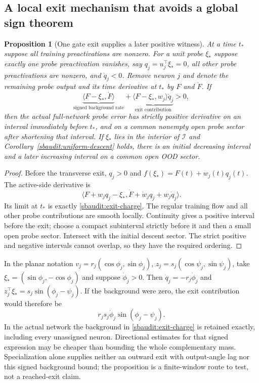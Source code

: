 \documentclass{article} %
\theoremstyle{plain}
\newtheorem{proposition}[theorem]{Proposition}
\theoremstyle{definition}
\theoremstyle{remark}
\begin{document}
\subsection{A local exit mechanism that avoids a global sign theorem}

\begin{proposition}[One gate exit supplies a later positive witness]
\label{sbaudit:exit-witness}
At a time $t_*$ suppose all training preactivations are nonzero. For a
unit probe $\xi_*$ suppose exactly one probe preactivation vanishes,
say $q_j=u_j^\top\xi_*=0$, all other probe preactivations are nonzero,
and $\dot q_j<0$. Remove neuron $j$ and denote the remaining probe
output and its time derivative at $t_*$ by $F$ and $\dot F$.
If
\begin{equation}\label{sbaudit:exit-charge}
 \underbrace{\langle F-\xi_*,\dot F\rangle}_{\text{signed background rate}}
 +\underbrace{\langle F-\xi_*,w_j\rangle\dot q_j}_{\text{exit contribution}}
 >0,
\end{equation}
then the actual full-network probe error has strictly positive derivative
on an interval immediately before $t_*$, and on a common nonempty open
probe sector after shortening that interval.
If $\xi_*$ lies in the interior of $\mathcal I$ and
Corollary~\ref{sbaudit:uniform-descent} holds, there is an initial decreasing
interval and a later increasing interval on a common open OOD sector.
\end{proposition}
\begin{proof}
Before the transverse exit, $q_j>0$ and
$f(\xi_*)=F(t)+w_j(t)q_j(t)$. The active-side derivative is
\[
 \langle F+w_jq_j-\xi_*,
       \dot F+\dot w_jq_j+w_j\dot q_j\rangle.
\]
Its limit at $t_*$ is exactly \eqref{sbaudit:exit-charge}. The regular
training flow and all other probe contributions are smooth locally.
Continuity gives a positive interval before the exit; choose a compact
subinterval strictly before it and then a small open probe sector.
Intersect with the initial descent sector. The strict positive and
negative intervals cannot overlap, so they have the required ordering.
\end{proof}

In the planar notation $v_j=r_j(\cos\phi_j,\sin\phi_j)$,
$z_j=s_j(\cos\psi_j,\sin\psi_j)$, take
$\xi_*=(\sin\phi_j,-\cos\phi_j)$ and suppose $\dot\phi_j>0$.
Then $\dot q_j=-r_j\dot\phi_j$ and
$z_j^\top\xi_*=s_j\sin(\phi_j-\psi_j)$.
If the background were zero, the exit contribution would therefore be
\begin{equation}\label{sbaudit:angular-exit}
 r_js_j\dot\phi_j\sin(\phi_j-\psi_j).
\end{equation}
In the actual network the background in \eqref{sbaudit:exit-charge}
is retained exactly, including every unassigned neuron. Directional
estimates for that signed expression may be cheaper than bounding the
whole complementary mass. Specialization alone supplies neither an
outward exit with output-angle lag nor this signed background bound;
the proposition is a finite-window route to test, not a reached-exit
claim.
\end{document}

